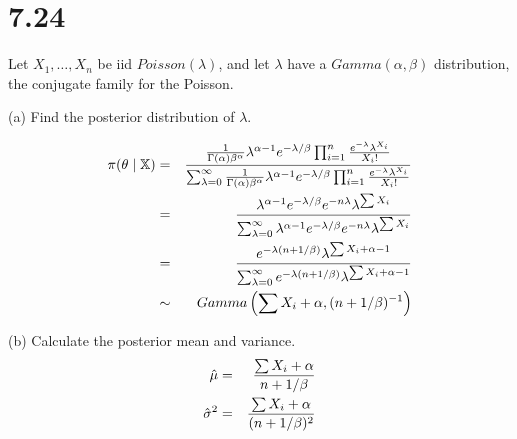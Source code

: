 \section*{7.24}
Let $X_1,\ldots,X_n$ be iid $Poisson(\lambda)$, and let $\lambda$
have a $Gamma(\alpha,\beta)$ distribution, the conjugate family
for the Poisson.

\bigskip
\noindent
(a) Find the posterior distribution of $\lambda$.

\begin{eqnarray*}
\pi(\theta\mid\mathbb X)&=&
{
{1\over\Gamma(\alpha)\beta^\alpha}
\lambda^{\alpha-1}
e^{-\lambda/\beta}
\prod_{i=1}^n
{e^{-\lambda}\lambda^{X_i}\over X_i!}
}
\over
\sum_{\lambda=0}^\infty
{
{1\over\Gamma(\alpha)\beta^\alpha}
\lambda^{\alpha-1}
e^{-\lambda/\beta}
\prod_{i=1}^n
{e^{-\lambda}\lambda^{X_i}\over X_i!}
}\\
&=&
{
\lambda^{\alpha-1}
e^{-\lambda/\beta}
e^{-n\lambda}
\lambda^{\sum X_i}
}
\over
\sum_{\lambda=0}^\infty
{
\lambda^{\alpha-1}
e^{-\lambda/\beta}
e^{-n\lambda}
\lambda^{\sum X_i}
}\\
&=&
{
e^{-\lambda(n+1/\beta)}
\lambda^{\sum X_i+\alpha-1}
}
\over
\sum_{\lambda=0}^\infty
{
e^{-\lambda(n+1/\beta)}
\lambda^{\sum X_i+\alpha-1}
}\\
&\sim&Gamma\left(\sum X_i+\alpha,(n+1/\beta)^{-1}\right)
\end{eqnarray*}

\bigskip
\noindent
(b) Calculate the posterior mean and variance.
\begin{eqnarray*}
\hat\mu&=&{\sum X_i+\alpha\over n+1/\beta}\\
\hat\sigma^2&=&{\sum X_i+\alpha\over(n+1/\beta)^2}
\end{eqnarray*}

